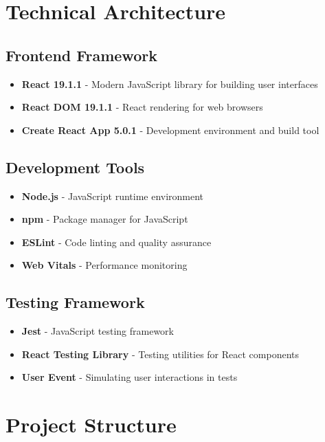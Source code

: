 \documentclass[12pt,a4paper]{article}
\begin{document}
\section{Technical Architecture}

\subsection{Frontend Framework}
\begin{itemize}
    \item \textbf{React 19.1.1} - Modern JavaScript library for building user interfaces
    \item \textbf{React DOM 19.1.1} - React rendering for web browsers
    \item \textbf{Create React App 5.0.1} - Development environment and build tool
\end{itemize}

\subsection{Development Tools}
\begin{itemize}
    \item \textbf{Node.js} - JavaScript runtime environment
    \item \textbf{npm} - Package manager for JavaScript
    \item \textbf{ESLint} - Code linting and quality assurance
    \item \textbf{Web Vitals} - Performance monitoring
\end{itemize}

\subsection{Testing Framework}
\begin{itemize}
    \item \textbf{Jest} - JavaScript testing framework
    \item \textbf{React Testing Library} - Testing utilities for React components
    \item \textbf{User Event} - Simulating user interactions in tests
\end{itemize}

\section{Project Structure}
\end{document}

